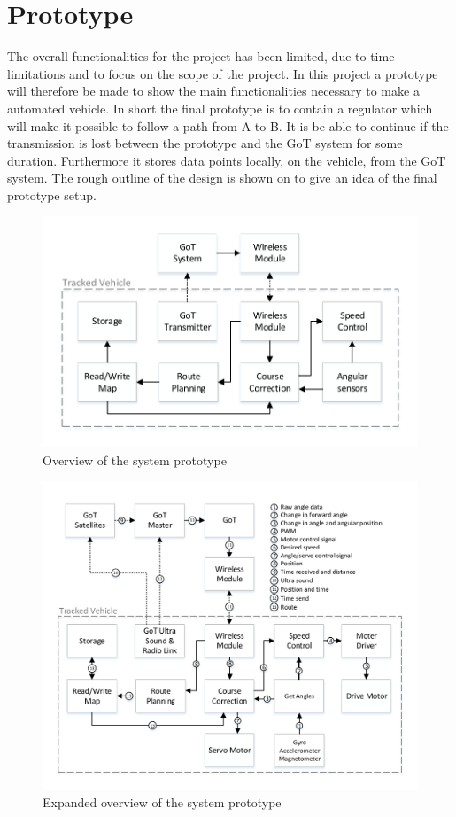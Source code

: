 \section{Prototype}
The overall functionalities for the project has been limited, due to time limitations and to focus on the scope of the project. In this project a prototype will therefore be made to show the main functionalities necessary to make a automated vehicle.
In short the final prototype is to contain a regulator which will make it possible to follow a path from A to B. It is be able to continue if the transmission is lost between the prototype and the GoT system for some duration. Furthermore it stores data points locally, on the vehicle, from the GoT system. The rough outline of the design is shown on  to give an idea of the final prototype setup.

\begin{figure}[H]
	\centering
	\includegraphics[scale=.9]{figures/systemOverview1}
	\caption{Overview of the system prototype}
	\label{fig:systemOverview1}
\end{figure}




\begin{figure}[H]
	\centering
	\includegraphics[scale=.9]{figures/systemOverview2}
	\caption{Expanded overview of the system prototype}
	\label{fig:systemOverview2}
\end{figure}